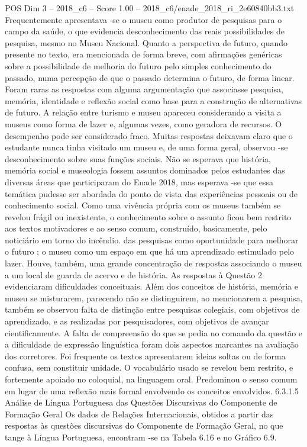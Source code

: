 \begin{textsample}{POS Dim 3 – 2018\_c6 – Score 1.00 – 2018\_c6/enade\_2018\_ri\_2e60840bb3.txt}
Frequentemente apresentava -se o museu como produtor de pesquisas para o campo da saúde, o que evidencia desconhecimento das reais possibilidades de pesquisa, mesmo no Museu Nacional.
Quanto a perspectiva de futuro, quando presente no texto, era mencionada de forma breve, com afirmações genéricas sobre a possibilidade de melhoria do futuro pelo simples conhecimento do passado, numa percepção de que o passado determina o futuro, de forma linear.
Foram raras as respostas com alguma argumentação que associasse pesquisa, memória, identidade e reflexão social como base para a construção de alternativas de futuro.
A relação entre turismo e museu apareceu considerando a visita a museus como forma de lazer e, algumas vezes, como geradora de recursos.
O desempenho pode ser considerado fraco.
Muitas respostas deixavam claro que o estudante nunca tinha visitado um museu e, de uma forma geral, observou -se desconhecimento sobre suas funções sociais.
Não se esperava que história, memória social e museologia fossem assuntos dominados pelos estudantes das diversas áreas que participaram do Enade 2018, mas esperava -se que essa temática pudesse ser abordada do ponto de vista das experiências pessoais ou de conhecimento social.
Como uma vivência própria com os museus também se revelou frágil ou inexistente, o conhecimento sobre o assunto ficou bem restrito aos textos motivadores e ao senso comum, construído, basicamente, pelo noticiário em torno do incêndio. das pesquisas como oportunidade para melhorar o futuro ; o museu como um espaço em que há um aprendizado estimulado pelo lazer.
Houve, também, uma grande concentração de respostas associando o museu a um local de guarda de acervo e de história.
As respostas à Questão 2 evidenciaram dificuldades conceituais.
Além dos conceitos de história, memória e museu se misturarem, parecendo não se distinguirem, ao mencionarem a pesquisa, também se observou falta de distinção entre pesquisas colegiais, com objetivos de aprendizado, e as realizadas por pesquisadores, com objetivos de avançar cientificamente.
A falta de compreensão do que se pedia no comando da questão e a dificuldade de expressão linguística foram dois aspectos marcantes na avaliação dos corretores.
Foi frequente os textos apresentarem ideias soltas ou de forma confusa, sem constituir unidade.
O vocabulário usado se revelou bem restrito, e fortemente apoiado no coloquial, na linguagem oral.
Predominou o senso comum em lugar de uma reflexão mais formal envolvendo os conceitos envolvidos. 6.3.1.5 Análise de Língua Portuguesa das Questões Discursivas do Componente de Formação Geral Os dados de Relações Internacionais, obtidos a partir das respostas às questões discursivas do Componente de Formação Geral, no que tange à Língua Portuguesa, encontram -se na Tabela 6.16 e no Gráfico 6.9.

\end{textsample}
